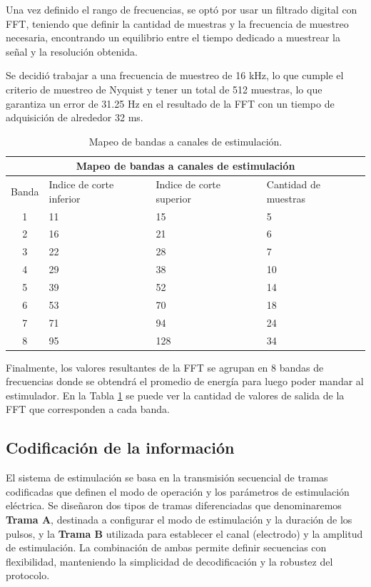 \documentclass[conference]{IEEEtran}
\begin{document}
Una vez definido el rango de frecuencias, se optó por usar un filtrado digital con FFT, teniendo que definir la cantidad de muestras y la frecuencia de muestreo necesaria, encontrando un equilibrio entre el tiempo dedicado a muestrear la señal y la resolución obtenida.

Se decidió trabajar a una frecuencia de muestreo de 16 kHz, lo que cumple el criterio de muestreo de Nyquist y tener un total de 512 muestras, lo que garantiza un error de 31.25 Hz en el resultado de la FFT con un tiempo de adquisición de alrededor 32 ms. 

\begin{table}
\centering
\caption{Mapeo de bandas a canales de estimulación.}
\label{table:freq_bins}
\begin{tabularx}{\columnwidth}{|c|X|X|X|}
    \hline
    \multicolumn{4}{|c|}{Mapeo de bandas a canales de estimulación} \\
    \hline
    Banda & Indice de corte inferior & Indice de corte superior & Cantidad de muestras \\
    \hline
    1 & 11 & 15 & 5 \\
    2 & 16 & 21 & 6 \\
    3 & 22 & 28 & 7 \\
    4 & 29 & 38 & 10 \\
    5 & 39 & 52 & 14 \\
    6 & 53 & 70 & 18 \\
    7 & 71 & 94 & 24 \\
    8 & 95 & 128 & 34 \\
    \hline
\end{tabularx}
\end{table}

Finalmente, los valores resultantes de la FFT se agrupan en 8 bandas de frecuencias donde se obtendrá el promedio de energía para luego poder mandar al estimulador. En la Tabla \ref{table:freq_bins} se puede ver la cantidad de valores de salida de la FFT que corresponden a cada banda.

\subsection{Codificación de la información}

El sistema de estimulación se basa en la transmisión secuencial de tramas codificadas que definen el modo de operación y los parámetros de estimulación eléctrica. Se diseñaron dos tipos de tramas diferenciadas que denominaremos \textbf{Trama A}, destinada a configurar el modo de estimulación y la duración de los pulsos, y la \textbf{Trama B} utilizada para establecer el canal (electrodo) y la amplitud de estimulación. La combinación de ambas permite definir secuencias con flexibilidad, manteniendo la simplicidad de decodificación y la robustez del protocolo.
\end{document}
